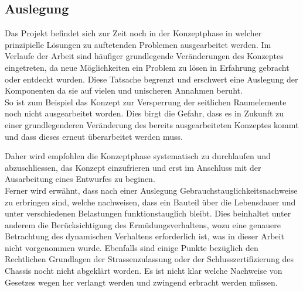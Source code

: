 
\subsection{Auslegung}
Das Projekt befindet sich zur Zeit noch in der Konzeptphase in welcher prinzipielle Lösungen zu auftetenden Problemen ausgearbeitet werden. Im Verlaufe der Arbeit sind häufiger grundlegende Veränderungen des Konzeptes eingetreten, da neue Möglichkeiten ein Problem zu lösen in Erfahrung gebracht oder entdeckt wurden. Diese Tatsache begrenzt und erschwert eine Auslegung der Komponenten da sie auf vielen und unischeren Annahmen beruht.\\

So ist zum Beispiel das Konzept zur Versperrung der seitlichen Raumelemente noch nicht ausgearbeitet worden. Dies birgt die Gefahr, dass es in Zukunft zu einer grundlegenderen Veränderung des bereits ausgearbeiteten Konzeptes kommt und dass dieses erneut überarbeitet werden muss.

Daher wird empfohlen die Konzeptphase systematisch zu durchlaufen und abzuschliessen, das Konzept einzufrieren und erst im Anschluss mit der Ausarbeitung eines Entwurfes zu beginen.\\

Ferner wird erwähnt, dass nach einer Auslegung Gebrauchstauglichkeitsnachweise zu erbringen sind, welche nachweisen, dass ein Bauteil über die Lebensdauer und unter verschiedenen Belastungen funktionstauglich bleibt. Dies beinhaltet unter anderem die Berücksichtigung des Ermüdungsverhaltens, wozu eine genauere Betrachtung des dynamischen Verhaltens erforderlich ist, was in dieser Arbeit nicht vorgenommen wurde.
Ebenfalls sind einige Punkte bezüglich den Rechtlichen Grundlagen der Strassenzulassung oder der Schlusszertifizierung des Chassis nocht nicht abgeklärt worden. Es ist nicht klar welche Nachweise von Gesetzes wegen her verlangt werden und zwingend erbracht werden müssen.

